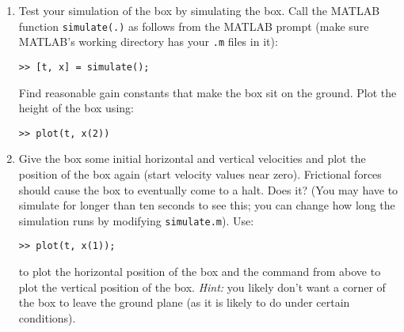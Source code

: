 \documentclass{article}
\begin{document}
\begin{enumerate}
\item Test your simulation of the box by simulating the box. Call the \textsc{MATLAB} function \texttt{simulate(.)} as follows from the \textsc{MATLAB} prompt (make sure \textsc{MATLAB}'s working directory has your \texttt{.m} files in it):
\begin{verbatim}
>> [t, x] = simulate();
\end{verbatim}
Find reasonable gain constants that make the box sit on the ground. Plot the
height of the box using:
\begin{verbatim}
>> plot(t, x(2))
\end{verbatim}
\item Give the box some initial horizontal and vertical velocities and plot
the position of the box again (start velocity values near zero). Frictional forces should cause the box to
eventually come to a halt. Does it? (You may have to simulate for longer than
ten seconds to see this; you can change how long the simulation runs by
modifying \texttt{simulate.m}).
Use: 
\begin{verbatim}
>> plot(t, x(1));  
\end{verbatim}
to plot the horizontal position of the box and the command from above to plot the vertical position of the box. \emph{Hint:} you likely don't want a corner of the box to leave the ground plane (as it is likely to do under certain conditions). 
\end{enumerate}
\end{document}
